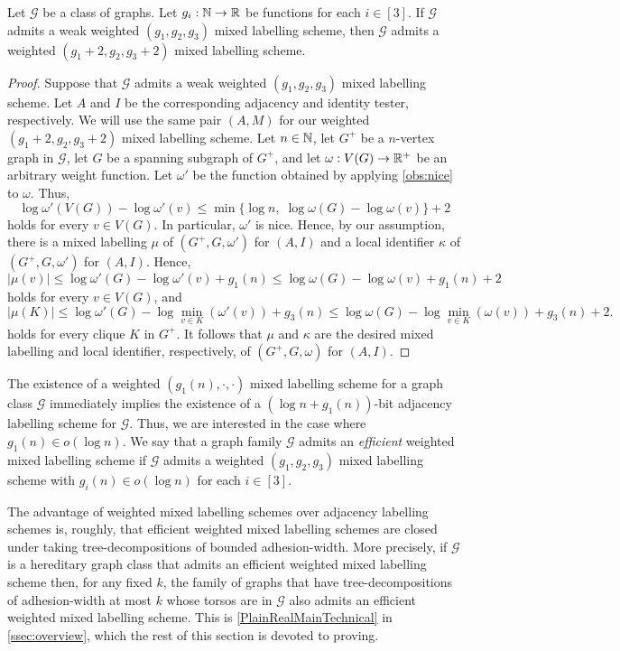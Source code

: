\documentclass{patmorin}
\renewcommand{\le}{\leqslant}
\renewcommand{\leq}{\leqslant}
\newcommand{\pat}[1]{\noindent\textcolor{Magenta}{PaMo: #1}}
\newcommand{\piotr}[1]{\noindent\textcolor{red}{PiMi: #1}}
\newcommand{\defin}[1]{\emph{\textcolor{brightmaroon}{#1}}}
\newcommand{\calG}{\mathcal{G}}
\begin{document}
\begin{lem}
    \label{lem:nice_weights}
    Let $\calG$ be a class of graphs.
    Let $g_i:\mathbb{N}\to\mathbb{R}$ be functions for each $i\in[3]$.
    If $\calG$ admits a weak weighted $(g_1,g_2,g_3)$ mixed labelling scheme, then $\calG$ admits a weighted $(g_1+2,g_2,g_3+2)$ mixed labelling scheme. %
\end{lem}
\begin{proof}
    Suppose that $\calG$ admits a weak weighted $(g_1,g_2,g_3)$ mixed labelling scheme.
    Let $A$ and $I$ be the corresponding adjacency and identity tester, respectively.
    We will use the same pair $(A, M)$ for our weighted $(g_1+2,g_2,g_3+2)$ mixed labelling scheme.
    Let $n\in \mathbb{N}$, let $G^+$ be a  $n$-vertex graph in $\calG$, let $G$ be a spanning subgraph of $G^+$, and let $\omega:V(G)\to \mathbb{R}^+$ be an arbitrary weight function.
    Let $\omega'$ be the function obtained by applying \cref{obs:nice} to $\omega$.
    Thus,
    \[
      \log\omega'(V(G))-\log\omega'(v)\le\min\{\log n,\;\log\omega(G)-\log\omega(v)\}+2
    \]
    holds for every $v\in V(G)$.
    In particular, $\omega'$ is nice.
    Hence, by our assumption, there is a mixed labelling $\mu$ of $(G^+,G,\omega')$ for $(A,I)$ and a local identifier $\kappa$ of $(G^+,G,\omega')$ for $(A,I)$.
    Hence,
    \[
    |\mu(v)| \leq \log \omega'(G) - \log\omega'(v) + g_1(n) \leq \log \omega(G) - \log\omega(v) + g_1(n) + 2
    \]
    holds for every $v\in V(G)$, and
    \[
    |\mu(K)|\le \log \omega'(G) - \log\min_{v\in K}(\omega'(v)) + g_3(n)
    \leq \log \omega(G) - \log\min_{v\in K}(\omega(v)) + g_3(n) + 2.
    \]
    holds for every clique $K$ in $G^+$.
    It follows that $\mu$ and  $\kappa$ are the desired  mixed labelling and local identifier, respectively,  of $(G^+,G,\omega)$ for $(A,I)$.
\end{proof}


The existence of a weighted $(g_1(n),\cdot,\cdot)$ mixed labelling scheme for a graph class $\calG$ immediately implies the existence of a $(\log n+g_1(n))$-bit adjacency labelling scheme for $\calG$. Thus, we are interested in the case where $g_1(n)\in o(\log n)$. We say that a graph family $\calG$ admits an \defin{efficient} weighted mixed labelling scheme if $\calG$ admits a weighted $(g_1,g_2,g_3)$ mixed labelling scheme with $g_i(n)\in o(\log n)$ for each $i\in [3]$.

The advantage of weighted mixed labelling schemes over adjacency labelling schemes is, roughly, that efficient weighted mixed labelling schemes are closed under taking tree-decompositions of bounded adhesion-width. More precisely, if $\calG$ is a hereditary graph class that admits an efficient weighted mixed labelling scheme then, for any fixed $k$, the family of graphs that have tree-decompositions of adhesion-width at most $k$ whose torsos are in $\calG$ also admits an efficient weighted mixed labelling scheme. This is \cref{PlainRealMainTechnical} in \cref{ssec:overview}, which the rest of this section is devoted to proving.
\end{document}
